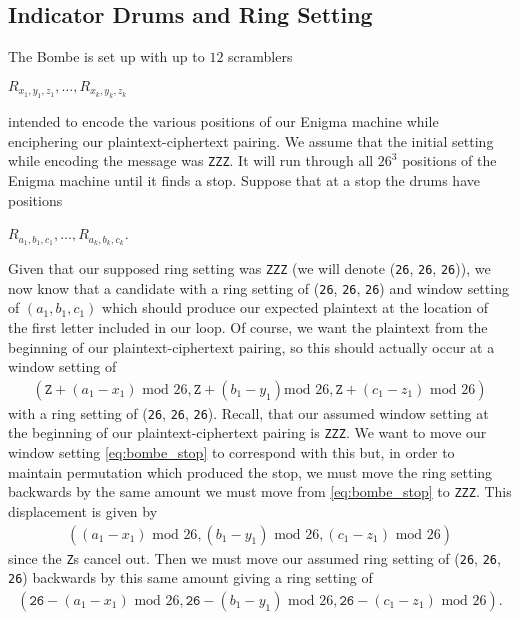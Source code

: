 \subsection{Indicator Drums and Ring Setting}
The Bombe is set up with up to $12$ scramblers
\begin{center}
  $R_{x_1, y_1, z_1},\dots, R_{x_k, y_k, z_k}$
\end{center}
intended to encode the various positions of our Enigma machine while
enciphering our plaintext-ciphertext pairing. We assume that the
initial setting while encoding the message was \texttt{ZZZ}. It will
run through all $26^3$ positions of the Enigma machine until it finds
a stop. Suppose that at a stop the drums have positions
\begin{center}
  $R_{a_1, b_1, c_1},\dots, R_{a_k, b_k, c_k}$.
\end{center}
Given that our supposed ring setting was \texttt{ZZZ} (we will denote
  (\texttt{26},
\texttt{26}, \texttt{26})), we now know that a candidate with a ring
setting of (\texttt{26},
\texttt{26}, \texttt{26}) and window setting of $(a_1, b_1, c_1)$
which should produce our expected plaintext at the location of the
first letter included in our loop. Of course, we want the plaintext
from the beginning of our plaintext-ciphertext pairing, so this
should actually occur at a window setting of
\begin{align}
  \label{eq:bombe_stop}
  (\texttt{Z} + (a_1-x_1)\text{ mod }26, \texttt{Z} + (b_1-y_1)\text{
  mod }26, \texttt{Z} + (c_1-z_1)\text{ mod }26)
\end{align}
with a ring setting of (\texttt{26},
\texttt{26}, \texttt{26}). Recall, that our assumed window setting at
the beginning of our plaintext-ciphertext pairing is \texttt{ZZZ}. We
want to move our window setting \ref{eq:bombe_stop} to correspond
with this but, in order to maintain permutation which produced the
stop, we must move the ring setting backwards by the same amount we
must move from \ref{eq:bombe_stop} to \texttt{ZZZ}. This displacement
is given by
\begin{align*}
  ((a_1-x_1)\text{ mod }26, (b_1-y_1)\text{ mod }26, (c_1-z_1)\text{ mod }26)
\end{align*}
since the \texttt{Z}s cancel out. Then we must move our assumed ring
setting of (\texttt{26},
\texttt{26}, \texttt{26}) backwards by this same amount giving a ring setting of
\begin{align*}
  (\texttt{26} - (a_1-x_1)\text{ mod }26, \texttt{26} -
  (b_1-y_1)\text{ mod }26, \texttt{26} - (c_1-z_1)\text{ mod }26).
\end{align*}
